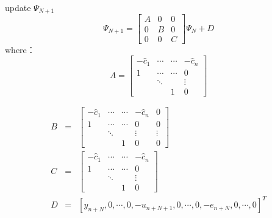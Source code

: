 \begin{frame}{update $\Psi_{N+1}$}
$$
\Psi_{N+1}=
\begin{bmatrix}
A  & 0 & 0 \\
0  & B & 0 \\
0  & 0 & C
\end{bmatrix}
\Psi_N+ D
$$
where：
$$
A=\begin{bmatrix}
-\hat c_1 & \cdots & \cdots & -\hat c_n  \\
1         & \cdots & \cdots &  0          \\
          & \ddots &        &  \vdots     \\
          &        &   1    &   0       
\end{bmatrix}
$$
\end{frame}
\begin{frame}
\begin{eqnarray*}
B &=& \begin{bmatrix}
-\hat c_1 & \cdots & \cdots & -\hat c_n &  0     \\
  1         & \cdots & \cdots &  0      &  0     \\
            & \ddots &        &  \vdots & \vdots \\
            &        &   1    &   0     &  0    
\end{bmatrix} \\
C &=& \begin{bmatrix}
-\hat c_1 & \cdots & \cdots & -\hat c_n \\
  1       & \cdots & \cdots &  0    \\
          & \ddots &        &  \vdots  \\
           &       &   1    &   0   
\end{bmatrix}\\
D &=& [ y_{n+N} ,  0 , \cdots , 0 ,  -u_{n+N+1} , 0 ,  \cdots ,  0 ,-e_{n+N} , 0 , \cdots , 0 ]^T
\end{eqnarray*}
\end{frame}
